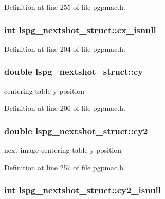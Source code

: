 Definition at line 255 of file pgpmac.h.\hypertarget{structlspg__nextshot__struct_a779b99533f0ed4e659177afb0b791ad2}{
\subsubsection[{cx\_\-isnull}]{\setlength{\rightskip}{0pt plus 5cm}int {\bf lspg\_\-nextshot\_\-struct::cx\_\-isnull}}}
\label{structlspg__nextshot__struct_a779b99533f0ed4e659177afb0b791ad2}


Definition at line 204 of file pgpmac.h.\hypertarget{structlspg__nextshot__struct_ab7a7b37a17f06c4e9ebdcdf056946098}{
\subsubsection[{cy}]{\setlength{\rightskip}{0pt plus 5cm}double {\bf lspg\_\-nextshot\_\-struct::cy}}}
\label{structlspg__nextshot__struct_ab7a7b37a17f06c4e9ebdcdf056946098}


centering table y position 

Definition at line 206 of file pgpmac.h.\hypertarget{structlspg__nextshot__struct_a3644e5c3f12af18a3b426d4d4d7e16a5}{
\subsubsection[{cy2}]{\setlength{\rightskip}{0pt plus 5cm}double {\bf lspg\_\-nextshot\_\-struct::cy2}}}
\label{structlspg__nextshot__struct_a3644e5c3f12af18a3b426d4d4d7e16a5}


next image centering table y position 

Definition at line 257 of file pgpmac.h.\hypertarget{structlspg__nextshot__struct_a57d78a389413827302df6ebe3dcb3c89}{
\subsubsection[{cy2\_\-isnull}]{\setlength{\rightskip}{0pt plus 5cm}int {\bf lspg\_\-nextshot\_\-struct::cy2\_\-isnull}}}
\label{structlspg__nextshot__struct_a57d78a389413827302df6ebe3dcb3c89}


